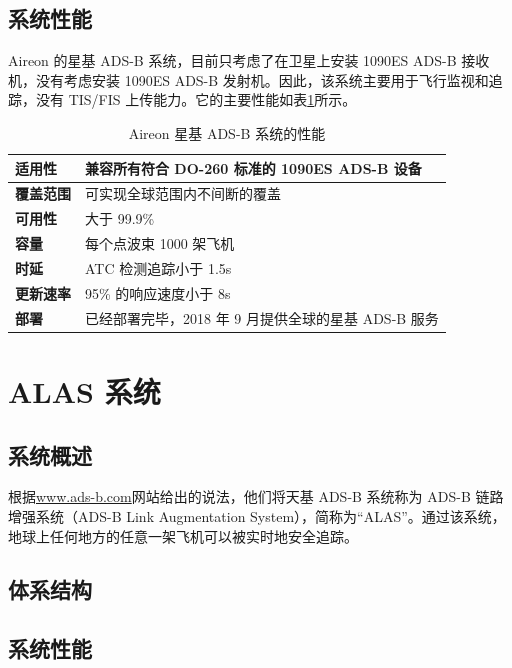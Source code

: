 \subsection{系统性能}

Aireon 的星基 ADS-B 系统，目前只考虑了在卫星上安装 1090ES ADS-B 接收机，没有考虑安装 1090ES ADS-B 发射机。因此，该系统主要用于飞行监视和追踪，没有 TIS/FIS 上传能力。它的主要性能如表\ref{tab:aireon_ads-b_performance_para}所示。

\renewcommand\arraystretch{1.5}
\begin{table}[htbp]
\centering
\caption{Aireon 星基 ADS-B 系统的性能}
\label{tab:aireon_ads-b_performance_para}
\begin{tabular}[b]{|p{2.2cm}<{\raggedleft}|p{10.5cm}<{\raggedright}|}
\hline
\textbf{适用性} & 兼容所有符合 DO-260 标准的 1090ES ADS-B 设备 \\
\hline
\textbf{覆盖范围} & 可实现全球范围内不间断的覆盖 \\
\hline
\textbf{可用性} & 大于 99.9\% \\
\hline
\textbf{容量} & 每个点波束 1000 架飞机 \\
\hline
\textbf{时延} & ATC 检测追踪小于 1.5s \\
\hline
\textbf{更新速率} & 95\% 的响应速度小于 8s \\
\hline
\textbf{部署} & 已经部署完毕，2018 年 9 月提供全球的星基 ADS-B 服务 \\
\hline
\end{tabular}
\end{table}


\section{ALAS 系统}

\subsection{系统概述}

根据\url{www.ads-b.com}网站给出的说法，他们将天基 ADS-B 系统称为 ADS-B 链路增强系统（ADS-B Link Augmentation System），简称为“ALAS”。通过该系统，地球上任何地方的任意一架飞机可以被实时地安全追踪。

\subsection{体系结构}

\subsection{系统性能}

